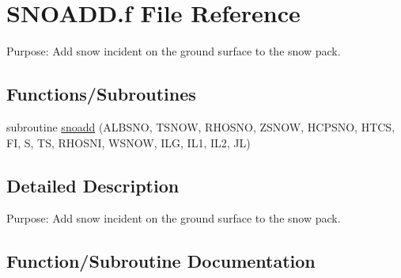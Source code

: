 \hypertarget{SNOADD_8f}{}\section{S\+N\+O\+A\+D\+D.\+f File Reference}
\label{SNOADD_8f}


Purpose\+: Add snow incident on the ground surface to the snow pack.  


\subsection*{Functions/\+Subroutines}
\begin{DoxyCompactItemize}
\item 
subroutine \hyperlink{SNOADD_8f_af7d261f12e703bc9bfc7bd0a543d51ae}{snoadd} (A\+L\+B\+S\+N\+O, T\+S\+N\+O\+W, R\+H\+O\+S\+N\+O, Z\+S\+N\+O\+W, H\+C\+P\+S\+N\+O, H\+T\+C\+S, F\+I, S, T\+S, R\+H\+O\+S\+N\+I, W\+S\+N\+O\+W, I\+L\+G, I\+L1, I\+L2, J\+L)
\end{DoxyCompactItemize}


\subsection{Detailed Description}
Purpose\+: Add snow incident on the ground surface to the snow pack. 



\subsection{Function/\+Subroutine Documentation}
\hypertarget{SNOADD_8f_af7d261f12e703bc9bfc7bd0a543d51ae}{}
